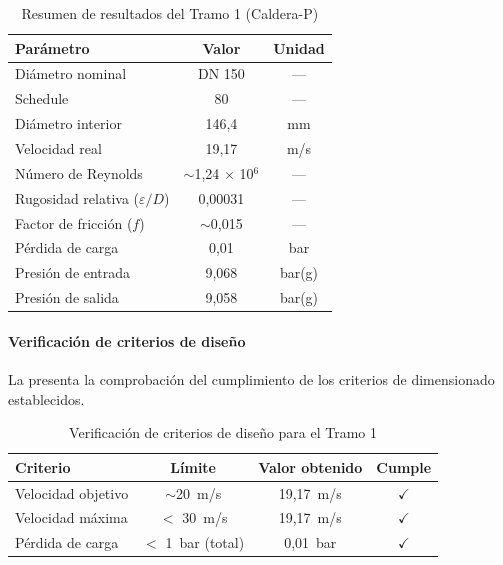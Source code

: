 \begin{table}[H]
	\centering
	\caption{Resumen de resultados del Tramo 1 (Caldera-P)}
	\label{tab:resultados-tramo1}
	\begin{tabular}{lcc}
		\toprule
		\textbf{Parámetro}                   & \textbf{Valor}             & \textbf{Unidad} \\
		\midrule
		Diámetro nominal                     & DN 150                     & ---             \\
		Schedule                             & 80                         & ---             \\
		Diámetro interior                    & 146,4                      & mm              \\
		Velocidad real                       & 19,17                      & m/s             \\
		Número de Reynolds                   & $\sim$1,24 $\times$ 10$^6$ & ---             \\
		Rugosidad relativa ($\varepsilon/D$) & 0,00031                    & ---             \\
		Factor de fricción ($f$)             & $\sim$0,015                & ---             \\
		Pérdida de carga                     & 0,01                       & bar             \\
		Presión de entrada                   & 9,068                      & bar(g)          \\
		Presión de salida                    & 9,058                      & bar(g)          \\
		\bottomrule
	\end{tabular}
\end{table}

\paragraph{Verificación de criterios de diseño}

La  presenta la comprobación del cumplimiento de los criterios de dimensionado establecidos.

\begin{table}[H]
	\centering
	\caption{Verificación de criterios de diseño para el Tramo 1}
	\label{tab:verificacion-criterios-tramo1}
	\begin{tabular}{lccc}
		\toprule
		\textbf{Criterio}  & \textbf{Límite}   & \textbf{Valor obtenido} & \textbf{Cumple} \\
		\midrule
		Velocidad objetivo & $\sim$20~m/s      & 19,17~m/s               & $\checkmark$    \\
		Velocidad máxima   & $<$ 30~m/s        & 19,17~m/s               & $\checkmark$    \\
		Pérdida de carga   & $<$ 1~bar (total) & 0,01~bar                & $\checkmark$    \\
		\bottomrule
	\end{tabular}
\end{table}

